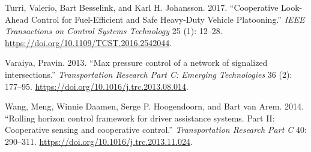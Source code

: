 \documentclass[]{book}
\theoremstyle{definition}
\theoremstyle{definition}
\theoremstyle{definition}
\theoremstyle{remark}
\begin{document}
\leavevmode\hypertarget{ref-Turri2017}{}%
Turri, Valerio, Bart Besselink, and Karl H. Johansson. 2017.
``Cooperative Look-Ahead Control for Fuel-Efficient and Safe Heavy-Duty
Vehicle Platooning.'' \emph{IEEE Transactions on Control Systems
Technology} 25 (1): 12--28.
\url{https://doi.org/10.1109/TCST.2016.2542044}.

\leavevmode\hypertarget{ref-Varaiya2013:TR-C}{}%
Varaiya, Pravin. 2013. ``Max pressure control of a network of signalized
intersections.'' \emph{Transportation Research Part C: Emerging
Technologies} 36 (2): 177--95.
\url{https://doi.org/10.1016/j.trc.2013.08.014}.

\leavevmode\hypertarget{ref-Meng2014b:TR-C}{}%
Wang, Meng, Winnie Daamen, Serge P. Hoogendoorn, and Bart van Arem.
2014. ``Rolling horizon control framework for driver assistance systems.
Part II: Cooperative sensing and cooperative control.''
\emph{Transportation Research Part C} 40: 290--311.
\url{https://doi.org/10.1016/j.trc.2013.11.024}.
\end{document}
